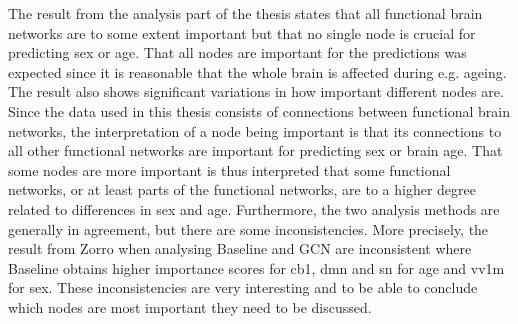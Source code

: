 

        


The result from the analysis part of the thesis states that all functional brain networks are to some extent important but that no single node is crucial for predicting sex or age. That all nodes are important for the predictions was expected since it is reasonable that the whole brain is affected during e.g. ageing. The result also shows significant variations in how important different nodes are. Since the data used in this thesis consists of connections between functional brain networks, the interpretation of a node being important is that its connections to all other functional networks are important for predicting sex or brain age. That some nodes are more important is thus interpreted that some functional networks, or at least parts of the functional networks, are to a higher degree related to differences in sex and age. Furthermore, the two analysis methods are generally in agreement, but there are some inconsistencies. More precisely, the result from Zorro when analysing Baseline and GCN are inconsistent where Baseline obtains higher importance scores for \acrshort{cb1}, \acrshort{dmn} and \acrshort{sn} for age and \acrshort{vv1m} for sex. These inconsistencies are very interesting and to be able to conclude which nodes are most important they need to be discussed. 

